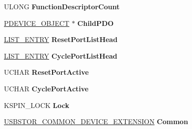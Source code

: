 \begin{DoxyCompactItemize}
\item 
\mbox{\label{struct_f_d_o___d_e_v_i_c_e___e_x_t_e_n_s_i_o_n_a413f3dd5ac9f224bb423e7f59e1b2d88}} 
U\+L\+O\+NG {\bfseries Function\+Descriptor\+Count}
\item 
\mbox{\label{struct_f_d_o___d_e_v_i_c_e___e_x_t_e_n_s_i_o_n_a5bb15448ea5dff13a1cefc92a389d4f7}} 
\hyperlink{struct___d_e_v_i_c_e___o_b_j_e_c_t}{P\+D\+E\+V\+I\+C\+E\+\_\+\+O\+B\+J\+E\+CT} $\ast$ {\bfseries Child\+P\+DO}
\item 
\mbox{\label{struct_f_d_o___d_e_v_i_c_e___e_x_t_e_n_s_i_o_n_a1bf7930a814fa4767eacbcd496015df0}} 
\hyperlink{struct___l_i_s_t___e_n_t_r_y}{L\+I\+S\+T\+\_\+\+E\+N\+T\+RY} {\bfseries Reset\+Port\+List\+Head}
\item 
\mbox{\label{struct_f_d_o___d_e_v_i_c_e___e_x_t_e_n_s_i_o_n_ade4ffb708d65251dd244ef3d5181526d}} 
\hyperlink{struct___l_i_s_t___e_n_t_r_y}{L\+I\+S\+T\+\_\+\+E\+N\+T\+RY} {\bfseries Cycle\+Port\+List\+Head}
\item 
\mbox{\label{struct_f_d_o___d_e_v_i_c_e___e_x_t_e_n_s_i_o_n_a1693a29a102681b0eb2b0185c05ecbdc}} 
U\+C\+H\+AR {\bfseries Reset\+Port\+Active}
\item 
\mbox{\label{struct_f_d_o___d_e_v_i_c_e___e_x_t_e_n_s_i_o_n_a0d3b34feb9f8b43af9438e2b217bd911}} 
U\+C\+H\+AR {\bfseries Cycle\+Port\+Active}
\item 
\mbox{\label{struct_f_d_o___d_e_v_i_c_e___e_x_t_e_n_s_i_o_n_af60b4cf8bb2ce5b331d05a8d9249dcd9}} 
K\+S\+P\+I\+N\+\_\+\+L\+O\+CK {\bfseries Lock}
\item 
\mbox{\label{struct_f_d_o___d_e_v_i_c_e___e_x_t_e_n_s_i_o_n_a05971ecb18b78b34f69d63382b159744}} 
\hyperlink{struct_____c_o_m_m_o_n___d_e_v_i_c_e___e_x_t_e_n_s_i_o_n____}{U\+S\+B\+S\+T\+O\+R\+\_\+\+C\+O\+M\+M\+O\+N\+\_\+\+D\+E\+V\+I\+C\+E\+\_\+\+E\+X\+T\+E\+N\+S\+I\+ON} {\bfseries Common}

\end{DoxyCompactItemize}
